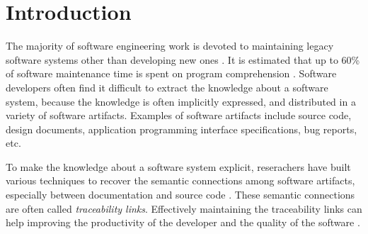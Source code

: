 
\section{Introduction}
\label{sec:introduction}

The majority of software engineering work is devoted to maintaining legacy software systems other than developing new ones \cite{abran_maintenance_1991}.
It is estimated that up to 60\% of software maintenance time is spent on program comprehension \cite{lawrence_software_2006}.
Software developers often find it difficult to extract the knowledge about a software system,
because the knowledge is often implicitly expressed,
and distributed in a variety of software artifacts.
Examples of software artifacts include source code, design documents, application programming interface specifications, bug reports, etc.

To make the knowledge about a software system explicit,
reserachers have built various techniques to recover the semantic connections among software artifacts,
especially between documentation and source code \cite{antoniol_recoveringtraceability_2002} \cite{deLucia_incremental_2006} \cite{marcus_recovering_2003}.
These semantic connections are often called \textit{traceability links}. 
Effectively maintaining the traceability links can help improving the productivity of the developer and the quality of the software \cite{neumuller_case_2006}.

